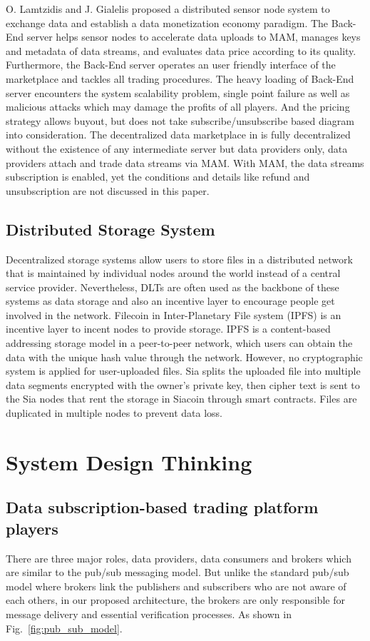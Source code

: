 \documentclass[conference]{IEEEtran}
\begin{document}
O. Lamtzidis and J. Gialelis \cite{IOTASensorNode} proposed a distributed sensor node system to exchange data and establish a data monetization economy paradigm. The Back-End server helps sensor nodes to accelerate data uploads to MAM, manages keys and metadata of data streams, and evaluates data price according to its quality. Furthermore, the Back-End server operates an user friendly interface of the marketplace and tackles all trading procedures. The heavy loading of Back-End server encounters the system scalability problem, single point failure as well as malicious attacks which may damage the profits of all players. And the pricing strategy allows buyout, but does not take subscribe/unsubscribe based diagram into consideration. The decentralized data marketplace in \cite{DDMSmartCities} is fully decentralized without the existence of any intermediate server but data providers only, data providers attach and trade data streams via MAM. With MAM, the data streams subscription is enabled, yet the conditions and details like refund and unsubscription are not discussed in this paper.
 
\subsection{Distributed Storage System}
Decentralized storage systems allow users to store files in a distributed network that is maintained by individual nodes around the world instead of a central service provider. Nevertheless, DLTs are often used as the backbone of these systems as data storage and also an incentive layer to encourage people get involved in the network. Filecoin \cite{FileCoin} in Inter-Planetary File system (IPFS) is an incentive layer to incent nodes to provide storage. IPFS is a content-based addressing storage model in a peer-to-peer network, which users can obtain the data with the unique hash value through the network. However, no cryptographic system is applied for user-uploaded files. Sia\cite{Sia} splits the uploaded file into multiple data segments encrypted with the owner's private key, then cipher text is sent to the Sia nodes that rent the storage in Siacoin through smart contracts. Files are duplicated in multiple nodes to prevent data loss.

\section{System Design Thinking}
\label{section:design_thinking}
\subsection{Data subscription-based trading platform players}
There are three major roles, data providers, data consumers and brokers which are similar to the pub/sub messaging model. But unlike the standard pub/sub model where brokers link the publishers and subscribers who are not aware of each others, in our proposed architecture, the brokers are only responsible for message delivery and essential verification processes. As shown in Fig.~\ref{fig:pub_sub_model}.
\end{document}
